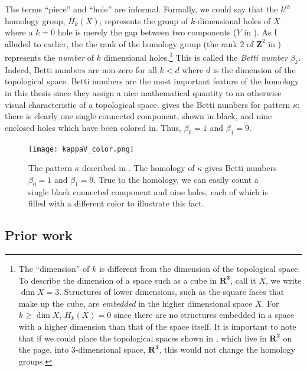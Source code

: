The terms ``piece'' and ``hole'' are informal. Formally, we could say that the $k^{th}$ homology group, $H_k(X)$, represents the group of $k$-dimensional holes of $X$ where a $k = 0$ hole is merely the gap between two components (\eg $Y$ in ). As I alluded to earlier, the the rank of the homology group (\eg the rank $2$ of $\mathbf{Z}^2$ in ) represents the \emph{number} of $k$ dimensional holes.\footnote{The ``dimension'' of $k$ is different from the dimension of the topological space. To describe the dimension of a space such as a cube in $\mathbf{R^3}$, call it $X$, we write $\dim X = 3$. Structures of lower dimensions, such as the square faces that make up the cube, are \textit{embedded} in the higher dimensional space $X$. For $k \geq \dim X$, $H_k(X) = 0$ since there are no structures embedded in a space with a higher dimension than that of the space itself. It is important to note that if we could place the topological spaces shown in , which live in $\mathbf{R^2}$ on the page, into 3-dimensional space, $\mathbf{R^3}$, this would not change the homology groups.} This is called the \textit{Betti number} $\beta_k$. Indeed, Betti numbers are non-zero for all $k < d$ where $d$ is the dimension of the topological space. Betti numbers are the most important feature of the homology in this thesis since they assign a nice mathematical quantity to an otherwise visual characteristic of a topological space.  gives the Betti numbers for pattern $\kappa$; there is clearly one single connected component, shown in black, and nine enclosed holes which have been colored in. Thus, $\beta_0 = 1$ and $\beta_1 = 9$.
%
\begin{figure}
	\centering
	\texttt{[image: kappaV\_color.png]}
	\caption{\label{fig:kappaV_color} The pattern $\kappa$ described in . The homology of $\kappa$ gives Betti numbers $\beta_0 = 1$ and $\beta_1 = 9$. True to the homology, we can easily count a single black connected component and nine holes, each of which is filled with a different color to illustrate this fact.}
\end{figure}

\subsection{Prior work}

